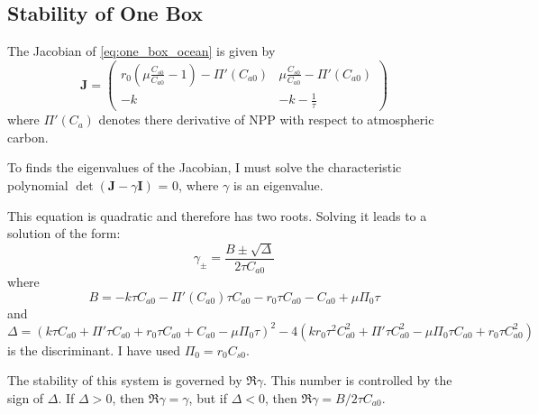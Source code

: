 \subsection{Stability of One Box}
The Jacobian of \cref{eq:one_box_ocean} is given by
\begin{equation}
  \label{eq:jacobian_of_one_box}
    \bm{J} = 
    \begin{pmatrix}
    r_0 \left( \mu \frac{C_{s0}}{C_{a0}} - 1\right) - \Pi'(C_{a0}) & 
    \mu \frac{C_{s0}}{C_{a0}} - \Pi'(C_{a0}) \\
    -k & -k - \frac{1}{\tau}
    \end{pmatrix}
  \end{equation}
where $\Pi'(C_a)$ denotes there derivative of NPP with respect to atmospheric carbon.
  
To finds the eigenvalues of the Jacobian, I must solve the characteristic polynomial $\det(\bm{J} - \gamma \bm{I})$ = 0, where $\gamma$ is an eigenvalue.

This equation is quadratic and therefore has two roots. Solving it leads to a solution of the form:
\begin{equation}
  \label{eq:eigenvalues_of_one_box_jac}
  \gamma_{\pm} = \frac{B \pm \sqrt{\Delta}}{2\tau C_{a0}}
\end{equation}
where
\begin{equation}
  \label{eq:B_in_one_box}
  B = -k \tau  C_{a0}-\Pi'(C_{a0}) \tau  C_{a0}-r_0 \tau  C_{a0}-C_{a0}+\mu  \Pi_0 \tau
\end{equation}
and
\begin{equation}
  \label{eq:discriminant_from_one_box}
  \Delta = \left(k \tau  C_{a0} +\Pi'\tau  C_{a0}+r_0 \tau  C_{a0}+C_{a0}-\mu  \Pi_0 \tau \right)^2-4 \left(k r_0 \tau ^2 C_{a0}^2+\Pi' \tau  C_{a0}^2-\mu  \Pi_0 \tau  C_{a0} +r_0 \tau  C_{a0}^2\right)
\end{equation}
is the discriminant. I have used $\Pi_0 = r_0 C_{s0}$.

The stability of this system is governed by $\Re \gamma$. This number is controlled by the sign of $\Delta$. If $\Delta > 0$, then $\Re \gamma = \gamma$, but if $\Delta < 0$, then
$\Re \gamma = B / 2\tau C_{a0}$. 

